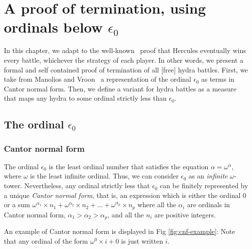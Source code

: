 
\chapter[A proof of termination, using epsilon0]{A proof of termination, using ordinals below \texorpdfstring{$\epsilon_0$}{Epsilon0}}

\label{cnf-math-def}
\label{chap:T1}

In this chapter, we adapt to \coq{} the well-known~\cite{KP82}  proof that Hercules eventually wins every battle, whichever the strategy  of each player.
In other words, we present  a formal and self contained proof of termination  of all [free] hydra battles.
First, we take from Manolios and Vroon~\cite{Manolios2005} a representation of the ordinal $\epsilon_0$ as terms in Cantor normal form. Then, we define a variant for hydra battles as a measure that maps any hydra to some ordinal strictly less than $\epsilon_0$.



\section{The ordinal \texorpdfstring{\(\epsilon_0\)}{epsilon0}}
\label{sec:epsilon0-intro}

\subsection{Cantor normal form}

The ordinal \(\epsilon_0\) is the least ordinal number that satisfies 
the equation \(\alpha = \omega^\alpha\), where \(\omega\) is 
the least infinite ordinal. Thus, we can consider \(\epsilon_0\) as an
\emph{infinite} \(\omega\)-tower.
Nevertheless, 
any ordinal strictly less that \(\epsilon_0\) 
can be finitely represented by a unique  \emph{Cantor normal form}, 
that is, an expression  which is either  the ordinal \(0\) or 
a sum  \(\omega^{\alpha_1} \times n_1 + \omega^{\alpha_2} \times n_2 + 
  \dots + \omega^{\alpha_p} \times n_p\) where all the \(\alpha_i\) 
are ordinals in Cantor  normal form, \(\alpha_1 > \alpha_2 > \alpha_p\), 
and all the \(n_i\) are positive integers.

An example of Cantor normal form is displayed in Fig \ref{fig:cnf-example}:
Note that  any ordinal of
the form \(\omega^0 \times i + 0\) is just written \(i\).

